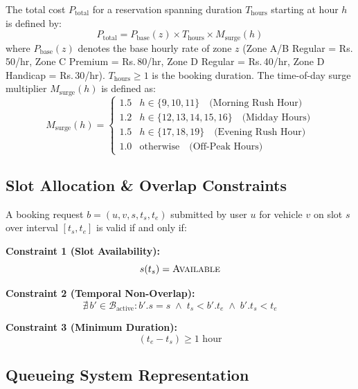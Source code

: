 \documentclass[conference,10pt]{IEEEtran}
\newcommand{\Rs}{\textrm{Rs.\,}}
\begin{document}
The total cost $P_{\text{total}}$ for a reservation spanning duration $T_{\text{hours}}$ starting at hour $h$ is defined by:
\begin{equation}
\label{eq:pricing}
P_{\text{total}} = P_{\text{base}}(z) \times T_{\text{hours}} \times M_{\text{surge}}(h)
\end{equation}
where $P_{\text{base}}(z)$ denotes the base hourly rate of zone $z$ (Zone A/B Regular = \Rs50/hr, Zone C Premium = \Rs80/hr, Zone D Regular = \Rs40/hr, Zone D Handicap = \Rs30/hr). $T_{\text{hours}} \geq 1$ is the booking duration. The time-of-day surge multiplier $M_{\text{surge}}(h)$ is defined as:
\begin{equation}
M_{\text{surge}}(h) = \begin{cases}
1.5 & h \in \{9,10,11\} \quad \text{(Morning Rush Hour)} \\
1.2 & h \in \{12,13,14,15,16\} \quad \text{(Midday Hours)} \\
1.5 & h \in \{17,18,19\} \quad \text{(Evening Rush Hour)} \\
1.0 & \text{otherwise} \quad \text{(Off-Peak Hours)}
\end{cases}
\end{equation}

\subsection{Slot Allocation \& Overlap Constraints}

A booking request $b = (u, v, s, t_s, t_e)$ submitted by user $u$ for vehicle $v$ on slot $s$ over interval $[t_s, t_e]$ is valid if and only if:

\textbf{Constraint 1 (Slot Availability):}
\begin{equation}
s(t_s) = \textsc{Available}
\end{equation}

\textbf{Constraint 2 (Temporal Non-Overlap):}
\begin{equation}
\nexists\, b' \in \mathcal{B}_{\text{active}}: b'.s = s \;\wedge\; t_s < b'.t_e \;\wedge\; b'.t_s < t_e
\end{equation}

\textbf{Constraint 3 (Minimum Duration):}
\begin{equation}
(t_e - t_s) \geq 1\text{ hour}
\end{equation}

\subsection{Queueing System Representation}
\end{document}
